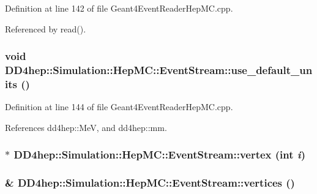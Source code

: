 Definition at line 142 of file Geant4EventReaderHepMC.cpp.

Referenced by read().\hypertarget{class_d_d4hep_1_1_simulation_1_1_hep_m_c_1_1_event_stream_acd5b712fdee97581ee70ce3365b11270}{
\subsubsection[{use\_\-default\_\-units}]{\setlength{\rightskip}{0pt plus 5cm}void DD4hep::Simulation::HepMC::EventStream::use\_\-default\_\-units ()}}
\label{class_d_d4hep_1_1_simulation_1_1_hep_m_c_1_1_event_stream_acd5b712fdee97581ee70ce3365b11270}


Definition at line 144 of file Geant4EventReaderHepMC.cpp.

References dd4hep::MeV, and dd4hep::mm.\hypertarget{class_d_d4hep_1_1_simulation_1_1_hep_m_c_1_1_event_stream_ac4d60be95873b8933646c17f4a306058}{
\subsubsection[{vertex}]{$\ast$ DD4hep::Simulation::HepMC::EventStream::vertex (int {\em i})}}
\label{class_d_d4hep_1_1_simulation_1_1_hep_m_c_1_1_event_stream_ac4d60be95873b8933646c17f4a306058}
\hypertarget{class_d_d4hep_1_1_simulation_1_1_hep_m_c_1_1_event_stream_acc8b24a014d6af70e07a6396375692e9}{
\subsubsection[{vertices}]{\& DD4hep::Simulation::HepMC::EventStream::vertices ()}}
\label{class_d_d4hep_1_1_simulation_1_1_hep_m_c_1_1_event_stream_acc8b24a014d6af70e07a6396375692e9}


